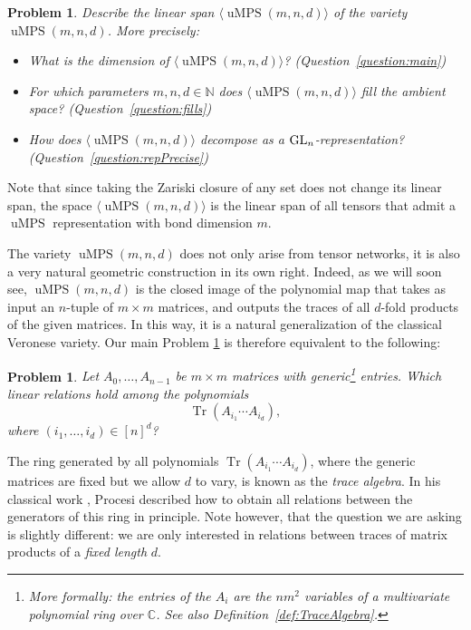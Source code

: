 \documentclass[10pt,a4paper]{amsart}
\numberwithin{equation}{section}
\newtheorem{problem}[Theorem]{Problem}
\DeclareMathOperator{\Tr}{Tr}
\newcommand{\CC}{\mathbb{C}}
\DeclareMathOperator{\uMPS}{uMPS}
\begin{document}
\begin{problem} \label{problem: linSpanUMPS}
Describe the linear span $\langle\uMPS(m,n,d)\rangle$ of the variety $\uMPS(m,n,d)$. More precisely:
\begin{itemize}\itemsep=0pt
    \item What is the dimension of $\langle\uMPS(m,n,d)\rangle$? {\rm (}Question~{\rm \ref{question:main})}
     \item For which parameters $m,n,d \in \mathbb{N}$ does $\langle\uMPS(m,n,d)\rangle$ fill the ambient space? {\rm (}Question~{\rm \ref{question:fills})}
    \item How does $\langle\uMPS(m,n,d)\rangle$ decompose as a ${\rm GL}_n$-representation? {\rm (}Question~{\rm \ref{question:repPrecise})}
\end{itemize}
\end{problem}

Note that since taking the Zariski closure of any set does not change its linear span, the space $\langle\uMPS(m,n,d)\rangle$ is the linear span of all tensors that admit a $\uMPS$ representation with bond dimension $m$.

The variety $\uMPS(m,n,d)$ does not only arise from tensor networks, it is also a very natural geometric construction in its own right. Indeed, as we will soon see, $\uMPS(m,n,d)$ is the closed image of the polynomial map that takes as input an $n$-tuple of $m \times m$ matrices, and outputs the traces of all $d$-fold products of the given matrices. In this way, it is a natural generalization of the classical Veronese variety. Our main Problem \ref{problem: linSpanUMPS} is therefore equivalent to the following:
\begin{problem}
Let $A_0,\dots,A_{n-1}$ be $m \times m$ matrices with generic\footnote{More formally: the entries of the $A_i$ are the $nm^2$ variables of a multivariate polynomial ring over $\CC$. See also Definition~\ref{def:TraceAlgebra}.} entries. Which linear relations hold among the polynomials
\[
\Tr(A_{i_1}\cdots A_{i_d}),
\]
where $(i_1,\dots,i_d) \in [n]^d$?
\end{problem}
The ring generated by all polynomials $\Tr(A_{i_1}\cdots A_{i_d})$, where the generic matrices are fixed but we allow $d$ to vary, is known as the \emph{trace algebra}. In his classical work \cite{procesi1976invariant}, Procesi described how to obtain all relations between the generators of this ring in principle. Note however, that the question we are asking is slightly different: we are only interested in relations between traces of matrix products of a \emph{fixed length} $d$.
\end{document}
